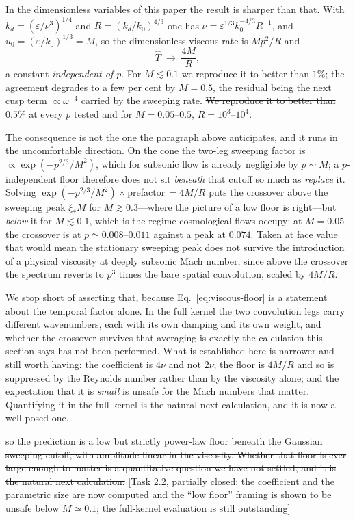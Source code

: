 \documentclass[10pt,prd,aps,nobibnotes,superscriptaddress,preprintnumbers,notitlepage]{revtex4-1}
\newcommand{\add}[1]{{\color{red}#1}}
\newcommand{\del}[1]{{\color{red}\sout{#1}}}
\newcommand{\why}[1]{{\color{red}\footnotesize\textsf{[#1]}}}
\newcommand{\add}[1]{#1}
\newcommand{\del}[1]{}
\newcommand{\why}[1]{}
\begin{document}
\add{In the dimensionless variables of this paper the result is sharper than that. With
$k_d=(\varepsilon/\nu^{3})^{1/4}$ and $R=(k_d/k_0)^{4/3}$ one has
$\nu=\varepsilon^{1/3}k_0^{-4/3}R^{-1}$, and $u_0=(\varepsilon/k_0)^{1/3}=M$, so the
dimensionless viscous rate is $M p^{2}/R$ and
\begin{equation}
  \hat T\;\longrightarrow\;\frac{4M}{R},
  \label{eq:viscous-floor}
\end{equation}
a constant \emph{independent of $p$}. \add{For $M\lesssim0.1$ we reproduce it to better
than $1\%$; the agreement degrades to a few per cent by $M=0.5$, the residual being the
next cusp term $\propto\omega^{-4}$ carried by the sweeping rate.} \del{We reproduce it
to better than $0.5\%$ at every $p$ tested and for $M=0.05$--$0.5$,
$R=10^{3}$--$10^{4}$.}

The consequence is not the one the paragraph above anticipates, and it runs in the
uncomfortable direction. On the cone the two-leg sweeping factor is
$\propto\exp(-p^{2/3}/M^{2})$, which for subsonic flow is already negligible by
$p\sim M$; a $p$-independent floor therefore does not sit \emph{beneath} that cutoff so
much as \emph{replace} it. Solving $\exp(-p^{2/3}/M^{2})\times$prefactor$\,=4M/R$ puts
the crossover above the sweeping peak $\xi_\ast M$ for $M\gtrsim0.3$---where the picture
of a low floor is right---but \emph{below} it for $M\lesssim0.1$, which is the regime
cosmological flows occupy: at $M=0.05$ the crossover is at $p\simeq0.008$--$0.011$
against a peak at $0.074$. Taken at face value that would mean the stationary sweeping
peak does not survive the introduction of a physical viscosity at deeply subsonic Mach
number, since above the crossover the spectrum reverts to $p^{3}$ times the bare spatial
convolution, scaled by $4M/R$.

We stop short of asserting that, because Eq.~\eqref{eq:viscous-floor} is a statement
about the temporal factor alone. In the full kernel the two convolution legs carry
different wavenumbers, each with its own damping and its own weight, and whether the
crossover survives that averaging is exactly the calculation this section says has not
been performed. What is established here is narrower and still worth having: the
coefficient is $4\nu$ and not $2\nu$; the floor is $4M/R$ and so is suppressed by the
Reynolds number rather than by the viscosity alone; and the expectation that it is
\emph{small} is unsafe for the Mach numbers that matter. Quantifying it in the full
kernel is the natural next calculation, and it is now a well-posed one.}
\del{so the prediction is a low but strictly power-law floor beneath the Gaussian
sweeping cutoff, with amplitude linear in the viscosity. Whether that floor is ever
large enough to matter is a quantitative question we have not settled, and it is the
natural next calculation.}
\why{Task 2.2, partially closed: the coefficient and the parametric size are now
computed and the ``low floor'' framing is shown to be unsafe below $M\simeq0.1$; the
full-kernel evaluation is still outstanding}
\end{document}
